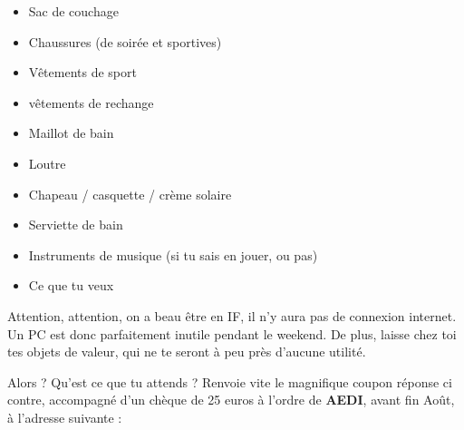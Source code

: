 \begin{itemize}
\item Sac de couchage
\item Chaussures (de soirée et sportives)
\item Vêtements de sport
\item vêtements de rechange
\item Maillot de bain
\item Loutre
\item Chapeau / casquette / crème solaire
\item Serviette de bain
\item Instruments de musique (si tu sais en jouer, ou pas)
\item Ce que tu veux
\end{itemize}

Attention, attention, on a beau être en IF, il n'y aura pas de connexion
internet. Un PC est donc parfaitement inutile pendant le weekend. De plus,
laisse chez toi tes objets de valeur, qui ne te seront à peu près d'aucune
utilité.

Alors ? Qu'est ce que tu attends ? Renvoie vite le magnifique coupon réponse ci
contre, accompagné d'un chèque de 25 euros à l'ordre de \textbf{AEDI}, avant fin Août,
à l'adresse suivante
:

\adresseCoupon
